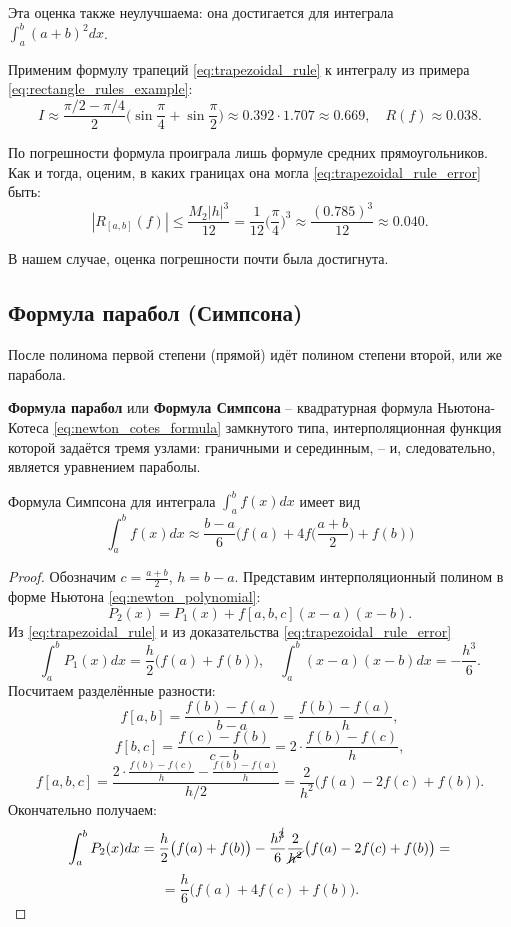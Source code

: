 \documentclass[../main.tex]{subfile}
\begin{document}
Эта оценка также неулучшаема: она достигается для интеграла\\
$\int_a^b (a+b)^2dx$.

\begin{example}\label{eq:trapezoidal_rule_example}
	Применим формулу трапеций \eqref{eq:trapezoidal_rule} к интегралу из
	примера \eqref{eq:rectangle_rules_example}:
	\[I\approx \frac{\pi/2-\pi/4}{2}\Big(\sin{\frac{\pi}{4}}+\sin{\frac{\pi}
	{2}}\Big)\approx 0.392\cdot 1.707\approx 0.669,\quad R(f)\approx 0.038.\]

	По погрешности формула проиграла лишь формуле средних прямоугольников.
	Как и тогда, оценим, в каких границах она могла
	\eqref{eq:trapezoidal_rule_error} быть:
	\[|R_{[a,b]}(f)|\le\frac{M_2|h|^3}{12}=\frac{1}{12}\Big(\frac{\pi}{4}
	\Big)^3\approx\frac{(0.785)^3}{12}\approx 0.040.\]

	В нашем случае, оценка погрешности почти была достигнута.
\end{example}
\newpage

\subsection{Формула парабол (Симпсона)}
После полинома первой степени (прямой) идёт полином степени второй, или же
парабола.

\begin{define}
	\textbf{Формула парабол} или \textbf{Формула Симпсона} -- квадратурная
	формула Ньютона-Котеса \eqref{eq:newton_cotes_formula} замкнутого типа,
	интерполяционная функция которой задаётся тремя узлами: граничными и
	серединным, -- и, следовательно, является уравнением параболы.
\end{define}

\begin{theorem}\label{eq:simpsons_1_3_rule}
	Формула Симпсона для интеграла $\int_a^b f(x)dx$ имеет вид
	\[\boxed{\int_a^b f(x)dx\approx\frac{b-a}{6}\Big(f(a)+4f\big(\frac{a+b}
	{2}\big)+f(b)\Big)}\]
\end{theorem}

\begin{proof}
	Обозначим $c=\frac{a+b}{2}$, $h=b-a$. Представим интерполяционный полином
	в форме Ньютона
	\eqref{eq:newton_polynomial}:
	\[P_2(x)=P_1(x)+f[a,b,c](x-a)(x-b).\]
	Из \eqref{eq:trapezoidal_rule} и из доказательства
	\eqref{eq:trapezoidal_rule_error}
	\[\int_a^b P_1(x)dx=\frac{h}{2}\big(f(a)+f(b)\big),\quad\int_a^b (x-a)
	(x-b)dx=-\frac{h^3}{6}.\]
	Посчитаем разделённые разности:
	\[f[a,b]=\frac{f(b)-f(a)}{b-a}=\frac{f(b)-f(a)}{h},\]
	\[f[b,c]=\frac{f(c)-f(b)}{c-b}=2\cdot\frac{f(b)-f(c)}{h},\]
	\[f[a,b,c]=\frac{2\cdot\frac{f(b)-f(c)}{h}-\frac{f(b)-f(a)}{h}}{h/2}=
	\frac{2}{h^2}\big(f(a)-2f(c)+f(b)\big).\]
	Окончательно получаем:
	\[\int_a^b P_2(x)dx=\frac{h}{2}\big(f(a)+f(b)\big)-\frac{h^{\cancel{3}}}
	{6}\frac{2}{\cancel{h^2}}\big(f(a)-2f(c)+f(b)\big)=\]
	\[=\frac{h}{6}\big(f(a)+4f(c)+f(b)\big).\]
\end{proof}
\end{document}
